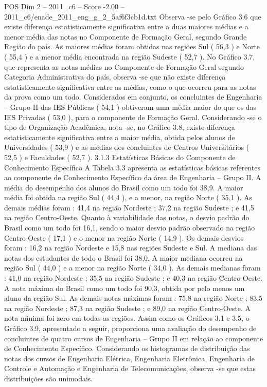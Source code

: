 \begin{textsample}{POS Dim 2 – 2011\_c6 – Score -2.00 – 2011\_c6/enade\_2011\_eng\_g\_2\_5af6f3cb1d.txt}
Observa -se pelo Gráfico 3.6 que existe diferença estatisticamente significativa entre a duas maiores médias e a menor média das notas no Componente de Formação Geral, segundo Grande Região do país.
As maiores médias foram obtidas nas regiões Sul ( 56,3 ) e Norte ( 55,4 ) e a menor média encontrada na região Sudeste ( 52,7 ).
No Gráfico 3.7, que representa as notas médias no Componente de Formação Geral segundo Categoria Administrativa do país, observa -se que não existe diferença estatisticamente significativa entre as médias, como o que ocorreu para as notas da prova como um todo.
Considerados em conjunto, os concluintes de Engenharia – Grupo II das IES Públicas ( 54,1 ) obtiveram uma média maior do que os das IES Privadas ( 53,0 ), para o componente de Formação Geral.
Considerando -se o tipo de Organização Acadêmica, nota -se, no Gráfico 3.8, existe diferença estatisticamente significativa entre a maior média, obtida pelos alunos de Universidades ( 53,9 ) e as médias dos concluintes de Centros Universitários ( 52,5 ) e Faculdades ( 52,7 ). 3.1.3 Estatísticas Básicas do Componente de Conhecimento Específico A Tabela 3.3 apresenta as estatísticas básicas referentes ao componente de Conhecimento Específico da área de Engenharia – Grupo II.
A média do desempenho dos alunos do Brasil como um todo foi 38,9.
A maior média foi obtida na região Sul ( 44,4 ), e a menor, na região Norte ( 35,1 ).
As demais médias foram : 41,4 na região Nordeste ; 37,2 na região Sudeste ; e 41,5 na região Centro-Oeste.
Quanto à variabilidade das notas, o desvio padrão do Brasil como um todo foi 16,1, sendo o maior desvio padrão observado na região Centro-Oeste ( 17,1 ) e o menor na região Norte ( 14,9 ).
Os demais desvios foram : 16,2 na região Nordeste e 15,8 nas regiões Sudeste e Sul.
A mediana das notas dos estudantes de todo o Brasil foi 38,0.
A maior mediana ocorreu na região Sul ( 44,0 ) e a menor na região Norte ( 34,0 ).
As demais medianas foram : 41,0 na região Nordeste ; 35,5 na região Sudeste ; e 40,3 na região Centro-Oeste.
A nota máxima do Brasil como um todo foi 90,3, obtida por pelo menos um aluno da região Sul.
As demais notas máximas foram : 75,8 na região Norte ; 83,5 na região Nordeste ; 87,3 na região Sudeste ; e 89,0 na região Centro-Oeste.
A nota mínima foi zero em todas as regiões.
Assim como os Gráficos 3.1 e 3.5, o Gráfico 3.9, apresentado a seguir, proporciona uma avaliação do desempenho de concluintes de quatro cursos de Engenharia – Grupo II em relação ao componente de Conhecimento Específico.
Considerando os histogramas de distribuição das notas dos cursos de Engenharia Elétrica, Engenharia Eletrônica, Engenharia de Controle e Automação e Engenharia de Telecomunicações, observa -se que estas distribuições são unimodais.

\end{textsample}
